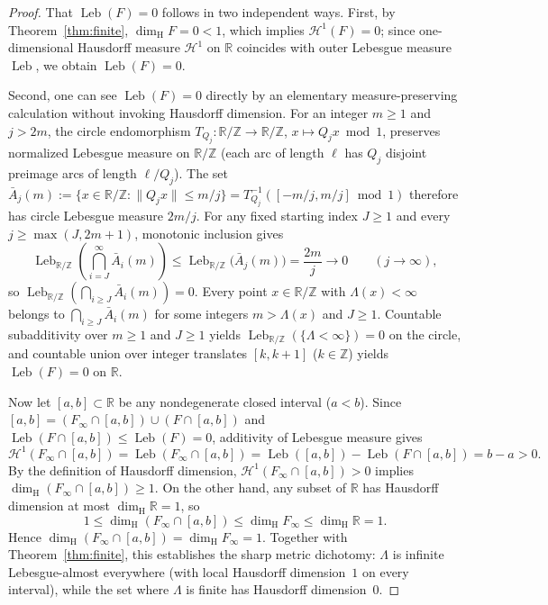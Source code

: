 \documentclass[11pt]{article}
\theoremstyle{definition}
\theoremstyle{remark}
\newcommand{\R}{\mathbb{R}}
\newcommand{\Z}{\mathbb{Z}}
\newcommand{\dimH}{\dim_{\mathrm{H}}}
\newcommand{\Lam}{\Lambda}
\begin{document}
\begin{proof}
That $\operatorname{Leb}(F)=0$ follows in two independent ways. First, by
Theorem~\ref{thm:finite}, $\dimH F=0<1$, which implies $\mathcal H^1(F)=0$;
since one-dimensional Hausdorff measure $\mathcal H^1$ on $\R$ coincides with
outer Lebesgue measure $\operatorname{Leb}$, we obtain $\operatorname{Leb}(F)=0$.

Second, one can see $\operatorname{Leb}(F)=0$ directly by an elementary
measure-preserving calculation without invoking Hausdorff dimension. For an
integer $m\ge1$ and $j>2m$, the circle endomorphism $T_{Q_j}:\R/\Z\to\R/\Z$,
$x\mapsto Q_jx\bmod1$, preserves normalized Lebesgue measure on $\R/\Z$ (each
arc of length $\ell$ has $Q_j$ disjoint preimage arcs of length $\ell/Q_j$).
The set $\bar A_j(m):=\{x\in\R/\Z:\|Q_jx\|\le m/j\}=T_{Q_j}^{-1}([-m/j,m/j]\bmod1)$
therefore has circle Lebesgue measure $2m/j$. For any fixed starting index
$J\ge1$ and every $j\ge\max(J,2m+1)$, monotonic inclusion gives
\[
\operatorname{Leb}_{\R/\Z}\left(\bigcap_{i=J}^\infty \bar A_i(m)\right)
\le\operatorname{Leb}_{\R/\Z}\bigl(\bar A_j(m)\bigr)=\frac{2m}{j}\longrightarrow0
\qquad(j\to\infty),
\]
so $\operatorname{Leb}_{\R/\Z}(\bigcap_{i\ge J}\bar A_i(m))=0$. Every point
$x\in\R/\Z$ with $\Lam(x)<\infty$ belongs to $\bigcap_{i\ge J}\bar A_i(m)$ for
some integers $m>\Lam(x)$ and $J\ge1$. Countable subadditivity over $m\ge1$ and
$J\ge1$ yields $\operatorname{Leb}_{\R/\Z}(\{\Lam<\infty\})=0$ on the circle,
and countable union over integer translates $[k,k+1]$ ($k\in\Z$) yields
$\operatorname{Leb}(F)=0$ on $\R$.

Now let $[a,b]\subset\R$ be any nondegenerate closed interval ($a<b$). Since
$[a,b]=(F_\infty\cap[a,b])\cup(F\cap[a,b])$ and $\operatorname{Leb}(F\cap[a,b])\le\operatorname{Leb}(F)=0$,
additivity of Lebesgue measure gives
\[
\mathcal H^1(F_\infty\cap[a,b])=\operatorname{Leb}(F_\infty\cap[a,b])
=\operatorname{Leb}([a,b])-\operatorname{Leb}(F\cap[a,b])=b-a>0.
\]
By the definition of Hausdorff dimension, $\mathcal H^1(F_\infty\cap[a,b])>0$
implies $\dimH(F_\infty\cap[a,b])\ge1$. On the other hand, any subset of $\R$
has Hausdorff dimension at most $\dimH\R=1$, so
\[
1\le\dimH(F_\infty\cap[a,b])\le\dimH F_\infty\le\dimH\R=1.
\]
Hence $\dimH(F_\infty\cap[a,b])=\dimH F_\infty=1$. Together with
Theorem~\ref{thm:finite}, this establishes the sharp metric dichotomy: $\Lam$
is infinite Lebesgue-almost everywhere (with local Hausdorff dimension~$1$ on
every interval), while the set where $\Lam$ is finite has Hausdorff
dimension~$0$.
\end{proof}
\end{document}
